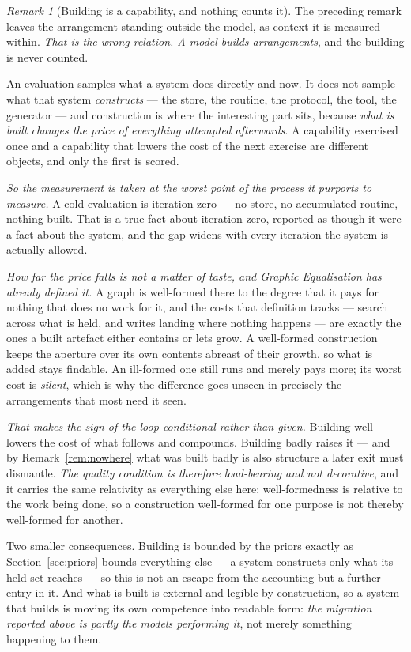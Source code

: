 \documentclass[11pt,a4paper]{article}
\theoremstyle{remark}
\newtheorem{remark}[definition]{Remark}
\begin{document}
\begin{remark}[Building is a capability, and nothing counts it]\label{rem:building}
The preceding remark leaves the arrangement standing outside the model, as context it is measured
within. \emph{That is the wrong relation. A model builds arrangements}, and the building is never
counted.

An evaluation samples what a system does directly and now. It does not sample what that system
\emph{constructs} --- the store, the routine, the protocol, the tool, the generator --- and construction
is where the interesting part sits, because \emph{what is built changes the price of everything
attempted afterwards}. A capability exercised once and a capability that lowers the cost of the next
exercise are different objects, and only the first is scored.

\emph{So the measurement is taken at the worst point of the process it purports to measure.} A cold
evaluation is iteration zero --- no store, no accumulated routine, nothing built. That is a true fact
about iteration zero, reported as though it were a fact about the system, and the gap widens with every
iteration the system is actually allowed.

\emph{How far the price falls is not a matter of taste, and Graphic Equalisation has already defined
it.} A graph is well-formed there to the degree that it pays for nothing that does no work for it, and
the costs that definition tracks --- search across what is held, and writes landing where nothing
happens --- are exactly the ones a built artefact either contains or lets grow. A well-formed
construction keeps the aperture over its own contents abreast of their growth, so what is added stays
findable. An ill-formed one still runs and merely pays more; its worst cost is \emph{silent}, which is
why the difference goes unseen in precisely the arrangements that most need it seen.

\emph{That makes the sign of the loop conditional rather than given.} Building well lowers the cost of
what follows and compounds. Building badly raises it --- and by Remark~\ref{rem:nowhere} what was built
badly is also structure a later exit must dismantle. \emph{The quality condition is therefore
load-bearing and not decorative}, and it carries the same relativity as everything else here:
well-formedness is relative to the work being done, so a construction well-formed for one purpose is
not thereby well-formed for another.

Two smaller consequences. Building is bounded by the priors exactly as Section~\ref{sec:priors} bounds
everything else --- a system constructs only what its held set reaches --- so this is not an escape from
the accounting but a further entry in it. And what is built is external and legible by construction, so
a system that builds is moving its own competence into readable form: \emph{the migration reported above
is partly the models performing it}, not merely something happening to them.
\end{remark}
\end{document}
